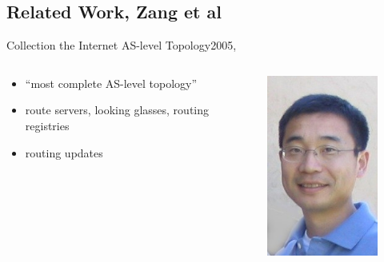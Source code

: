 \documentclass[ngerman,compress,hyperref={bookmarks}]{beamer}
\begin{document}
\subsection{Related Work, Zang et al}
\begin{frame}{Collection the Internet AS-level Topology}{2005, \cite{Zhang:2005:CIA:1052812.1052825}}
  \begin{columns}[c]
    \begin{column}{0.5\textwidth}
      \begin{itemize}
        \item ``most complete AS-level topology''
        \item route servers, looking glasses, routing registries
        \item routing updates
      \end{itemize}
    \end{column}
    \begin{column}{0.08\textwidth}
      \begin{figure}
        \label{zhang_et_al}
        \includegraphics[width=1\textwidth]{images/zhang_b}\\

\end{figure}
\end{column}
\end{columns}
\end{frame}
\end{document}

